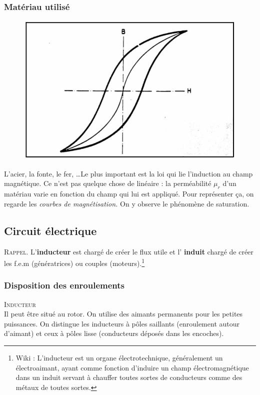 	\subsubsection{Matériau utilisé}
	\begin{figure}
	\vspace{-5mm}
	\includegraphics[scale=0.4]{ch2/image8} 
	\label{fig:2.7}
	\end{figure}
	L'acier, la fonte, le fer, \dots Le plus important est la loi qui lie l'induction au champ magnétique. Ce n'est 
	pas quelque chose de linéaire : la perméabilité $\mu _r$ d'un matériau varie en 
	fonction du champ qui lui est appliqué. Pour représenter ça, on regarde 
	les \textit{courbes de magnétisation.} On y observe le phénomène de saturation. 
	
	\subsection{Circuit électrique}
	\textsc{Rappel.} L'\textbf{inducteur} est chargé de créer le flux utile et l'
	\textbf{induit} chargé de créer les f.e.m (génératrices) ou couples (moteurs).\footnote{Wiki : L'inducteur est un organe 
	électrotechnique, généralement un électroaimant, ayant comme fonction d'induire 
	un champ électromagnétique dans un induit servant à chauffer toutes sortes de 
	conducteurs comme des métaux de toutes sortes.}
	
		\subsubsection{Disposition des enroulements}
		\textsc{Inducteur}\\
		Il peut être situé au rotor. On utilise des aimants permanents pour les 
		petites puissances. On distingue les inducteurs à pôles saillants (enroulement autour d'aimant) et ceux à pôles lisse (conducteurs déposés dans les encoches).\\
		
